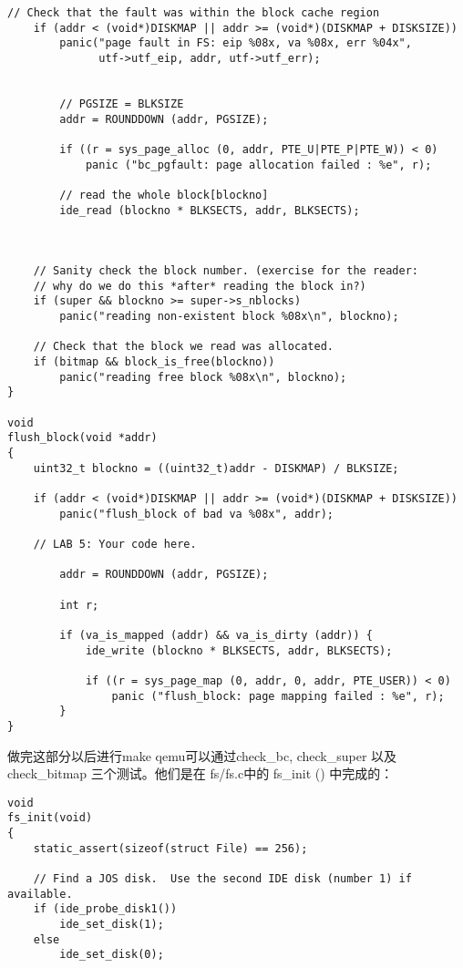 \documentclass{article}
\newcommand{\funcname}[1]{{\ttfamily \small #1}}
\begin{document}
\begin{CJK*}{UTF8}{gkai}
\begin{lstlisting}[style=ccode, title={\scriptsize \ttfamily \bfseries fc/bc.c}]
	// Check that the fault was within the block cache region
	if (addr < (void*)DISKMAP || addr >= (void*)(DISKMAP + DISKSIZE))
		panic("page fault in FS: eip %08x, va %08x, err %04x",
		      utf->utf_eip, addr, utf->utf_err);

    
        // PGSIZE = BLKSIZE
        addr = ROUNDDOWN (addr, PGSIZE);

        if ((r = sys_page_alloc (0, addr, PTE_U|PTE_P|PTE_W)) < 0)
            panic ("bc_pgfault: page allocation failed : %e", r);

        // read the whole block[blockno]
        ide_read (blockno * BLKSECTS, addr, BLKSECTS);



	// Sanity check the block number. (exercise for the reader:
	// why do we do this *after* reading the block in?)
	if (super && blockno >= super->s_nblocks)
		panic("reading non-existent block %08x\n", blockno);

	// Check that the block we read was allocated.
	if (bitmap && block_is_free(blockno))
		panic("reading free block %08x\n", blockno);
}

void
flush_block(void *addr)
{
	uint32_t blockno = ((uint32_t)addr - DISKMAP) / BLKSIZE;

	if (addr < (void*)DISKMAP || addr >= (void*)(DISKMAP + DISKSIZE))
		panic("flush_block of bad va %08x", addr);

	// LAB 5: Your code here.

        addr = ROUNDDOWN (addr, PGSIZE);

        int r;

        if (va_is_mapped (addr) && va_is_dirty (addr)) {
            ide_write (blockno * BLKSECTS, addr, BLKSECTS);
        
            if ((r = sys_page_map (0, addr, 0, addr, PTE_USER)) < 0)
                panic ("flush_block: page mapping failed : %e", r);
        }
}
\end{lstlisting}

\vspace{2em}

做完这部分以后进行make qemu可以通过check\_bc, check\_super 以及 check\_bitmap 三个测试。他们是在 fs/fs.c中的 \funcname {fs\_init ()} 中完成的：

\begin{lstlisting}[style=ccode, title={\scriptsize \ttfamily \bfseries fs/fs.c: fs\_init()}]
void
fs_init(void)
{
	static_assert(sizeof(struct File) == 256);

	// Find a JOS disk.  Use the second IDE disk (number 1) if available.
	if (ide_probe_disk1())
		ide_set_disk(1);
	else
		ide_set_disk(0);
	

\end{lstlisting}
\end{CJK*}
\end{document}
